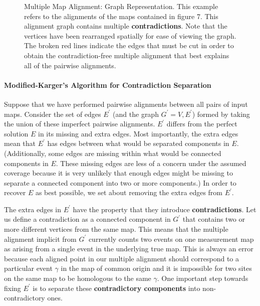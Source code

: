 \documentclass[11pt]{article}
\begin{document}
\begin{figure}[h!]
\begin{center}
\caption{Multiple Map Alignment: Graph Representation. This example refers to the alignments of the maps contained in figure 7.  This alignment graph contains multiple \textbf{contradictions}.  Note that the vertices have been rearranged spatially for ease of viewing the graph.  The broken red lines indicate the edges that must be cut in order to obtain the contradiction-free multiple alignment that best explains all of the pairwise alignments.}
\end{center}
\end{figure}


\paragraph{Modified-Karger's Algorithm for Contradiction Separation\newline}
\par{
Suppose that we have performed pairwise alignments between all pairs of input maps.  Consider the set of edges $E^\prime$ (and the graph $G^\prime={V,E^\prime}$) formed by taking the union of these imperfect pairwise alignments.  $E^\prime$ differs from the perfect solution $E$ in its missing and extra edges.  Most importantly, the extra edges mean that $E^\prime$ has edges between what would be separated components in $E$.  (Additionally, some edges are missing within what would be connected components in $E$. These missing edges are less of a concern under the assumed coverage because it is very unlikely that enough edges might be missing to separate a connected component into two or more components.) In order to recover $E$ as best possible, we set about removing the extra edges from $E^\prime$.
}
\par{
The extra edges in $E^\prime$ have the property that they introduce \textbf{contradictions}.  Let us define a contradiction as a connected component in $G^\prime$ that contains two or more different vertices from the same map.  This means that the multiple alignment implicit from $G^\prime$ currently counts two events on one measurement map as arising from a single event in the underlying true map.  This is always an error because each aligned point in our multiple alignment should correspond to a particular event $\gamma$ in the map of common origin and it is impossible for two sites on the same map to be homologous to the same $\gamma$.  One important step towards fixing $E^\prime$ is to separate these \textbf{contradictory components} into non-contradictory ones.
}
\end{document}
